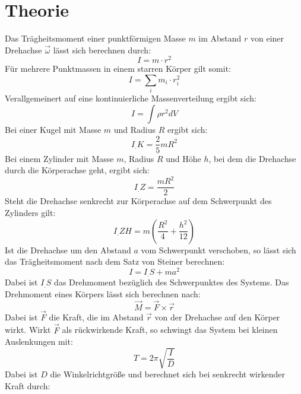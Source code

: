 
\section{Theorie}
\label{sec:Theorie}

Das Trägheitsmoment einer punktförmigen Masse $m$ im Abstand $r$ von einer Drehachse $\vec{\omega}$ lässt sich berechnen durch:
\begin{equation}
I = m\cdot r^2 
\end{equation}
Für mehrere Punktmassen in einem starren Körper gilt somit:
\begin{equation}
I = \sum_i m_i\cdot r_i^2\label{eq:I_S}
\end{equation}
Verallgemeinert auf eine kontinuierliche Massenverteilung ergibt sich:
\begin{equation}
I = \int \rho r^2 dV \label{eq:I_S2}
\end{equation}
Bei einer Kugel mit Masse $m$ und Radius $R$ ergibt sich:
\begin{equation}
I_.{K} = \frac{2}{5}mR^2 \label{eq:I_SK}
\end{equation}
Bei einem Zylinder mit Masse $m$, Radius $R$ und Höhe $h$, bei dem die Drehachse durch die Körperachse geht, ergibt sich:
\begin{equation}
I_.{Z} = \frac{mR^2}{2} \label{eq:I_SZ}
\end{equation}
Steht die Drehachse senkrecht zur Körperachse auf dem Schwerpunkt des Zylinders gilt:
\begin{equation}
I_.{ZH} = m\left(\frac{R^2}{4}+\frac{h^2}{12}\right) \label{eq:I_SZH}
\end{equation}
Ist die Drehachse um den Abstand $a$ vom Schwerpunkt verschoben, so lässt sich das Trägheitsmoment nach dem Satz von Steiner berechnen:
\begin{equation}
I = I_.S+m a^2 \label{eq:Satz von Steiner}
\end{equation}
Dabei ist $I_.S$ das Drehmoment bezüglich des Schwerpunktes des Systems. Das Drehmoment eines Körpers lässt sich berechnen nach:
\begin{equation}
\vec{M} = \vec{F}\times\vec{r} \label{eq;M}
\end{equation}
Dabei ist $\vec{F}$ die Kraft, die im Abstand $\vec{r}$ von der Drehachse auf den Körper wirkt. Wirkt $\vec{F}$ als rückwirkende Kraft, so schwingt das System bei kleinen Auslenkungen mit:
\begin{equation}
T = 2\pi\sqrt{\frac{I}{D}} \label{eq:T}
\end{equation}
Dabei ist $D$ die Winkelrichtgröße und berechnet sich bei senkrecht wirkender Kraft durch: 
